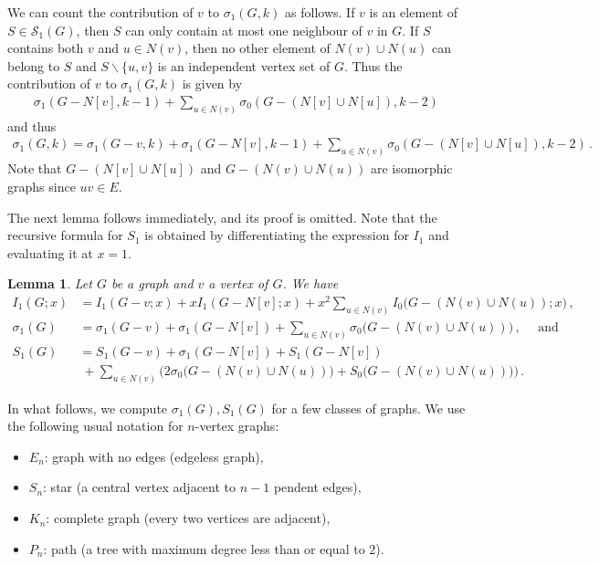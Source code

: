 \documentclass[a4paper,12pt]{amsart}
\newtheorem{lemma}{Lemma}
\theoremstyle{remark}
\begin{document}
We can count the contribution of $v$ to $\sigma_1(G,k)$ as follows. If $v$ is an element of $S\in \mathcal{S}_1(G)$, then $S$ can only contain at most one neighbour of $v$ in $G$. If $S$ contains both $v$ and $u\in N(v)$, then no other element of $N(v) \cup N(u)$ can belong to $S$ and $S\backslash \{u,v\}$ is an independent vertex set of $G$. Thus the contribution of $v$ to $\sigma_1(G,k)$ is given by
 \begin{align*}
 \sigma_1(G-N[v],k-1) + \sum_{u \in N(v)} \sigma_0(G-(N[v]\cup N[u]),k-2)\,
 \end{align*}
 and thus
  \begin{align*}
 \sigma_1(G,k)= \sigma_1(G-v,k)+ \sigma_1(G-N[v],k-1) + \sum_{u \in N(v)} \sigma_0(G-(N[v]\cup N[u]),k-2)\,.
 \end{align*}
Note that $G-(N[v]\cup N[u])$ and $G-(N(v)\cup N(u))$ are isomorphic graphs since $uv\in E$. 

\medskip

The next lemma follows immediately, and its proof is omitted. Note that the recursive formula for $S_1$ is obtained by differentiating the expression for $I_1$ and evaluating it at $x = 1$.

\begin{lemma}\label{lem:g-v}
Let $G$ be a graph and $v$ a vertex of $G$. We have
\begin{align*}
I_1(G;x)&=I_1(G-v;x)+xI_1(G-N[v];x)+x^2\sum_{u\in N(v)}I_0 \big( G-(N(v)\cup N(u)); x \big)\,,\\
\sigma_1(G)&=\sigma_1(G-v)+\sigma_1(G-N[v]) + \sum_{u\in N(v)}\sigma_0\big(G-(N(v)\cup N(u)) \big) \,, \quad \text{ and }\\
S_1(G)&=S_1(G-v)+\sigma_1(G-N[v]) + S_1(G-N[v])\\
 & ~ + \sum_{u\in N(v)}\Big( 2\sigma_0\big(G-(N(v)\cup N(u)) \big) + S_0\big(G-(N(v)\cup N(u))\big) \Big)\,.
\end{align*}
\end{lemma}


\medskip
In what follows, we compute $\sigma_1(G), S_1(G)$ for a few classes of graphs. We use the following usual notation for $n$-vertex graphs:
\begin{itemize}
\item $E_n$: graph with no edges (edgeless graph),
\item $S_n$: star (a central vertex adjacent to $n-1$ pendent edges),
\item $K_n$: complete graph (every two vertices are adjacent),
\item $P_n$: path (a tree with maximum degree less than or equal to $2$).
\end{itemize}
\end{document}
